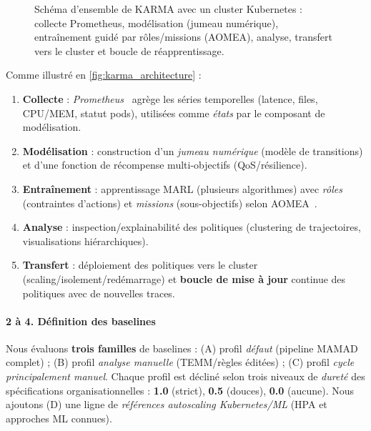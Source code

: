 \begin{figure}[h!]
  \centering
  
  \caption{Schéma d’ensemble de KARMA avec un cluster Kubernetes : collecte Prometheus, modélisation (jumeau numérique), entraînement guidé par rôles/missions (AOMEA), analyse, transfert vers le cluster et boucle de réapprentissage.}
  \label{fig:karma_architecture}
\end{figure}

Comme illustré en \autoref{fig:karma_architecture} :
\begin{enumerate}[label=\textbf{\arabic*)}, leftmargin=3.5mm, itemsep=2pt, topsep=2pt]
  \item \textbf{Collecte} : \textit{Prometheus}~\cite{prometheus} agrège les séries temporelles (latence, files, CPU/MEM, statut pods), utilisées comme \emph{états} par le composant de modélisation.
  \item \textbf{Modélisation} : construction d’un \emph{jumeau numérique} (modèle de transitions) et d’une fonction de récompense multi-objectifs (QoS/résilience).
  \item \textbf{Entraînement} : apprentissage MARL (plusieurs algorithmes) avec \textit{rôles} (contraintes d’actions) et \textit{missions} (sous-objectifs) selon AOMEA~\cite{soule2024aomea}.
  \item \textbf{Analyse} : inspection/explainabilité des politiques (clustering de trajectoires, visualisations hiérarchiques).
  \item \textbf{Transfert} : déploiement des politiques vers le cluster (scaling/isolement/redémarrage) et \textbf{boucle de mise à jour} continue des politiques avec de nouvelles traces.
\end{enumerate}

\paragraph{2 à 4. Définition des baselines}

Nous évaluons \textbf{trois familles} de baselines : (A) profil \emph{défaut} (pipeline MAMAD complet) ; (B) profil \emph{analyse manuelle} (TEMM/règles éditées) ; (C) profil \emph{cycle principalement manuel}. Chaque profil est décliné selon trois niveaux de \emph{dureté} des spécifications organisationnelles : \textbf{1.0} (strict), \textbf{0.5} (douces), \textbf{0.0} (aucune). Nous ajoutons (D) une ligne de \emph{références autoscaling Kubernetes/ML} (HPA et approches ML connues).

